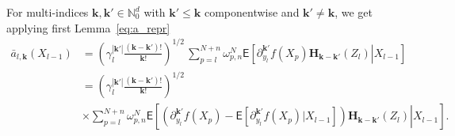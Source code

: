 \documentclass[preprint]{imsart}
\begin{document}
For multi-indices $\mathbf k,\mathbf k'\in\mathbb N_0^d$
with $\mathbf k'\le\mathbf k$ componentwise
and $\mathbf k'\ne\mathbf k$,
we get applying first Lemma~\ref{eq:a_repr}
\begin{equation*}
\begin{split}
\bar a_{l,\mathbf{k}}(X_{l-1})
&=\left(\gamma_{l}^{|\mathbf{k}'|}\frac{(\mathbf{k}-\mathbf{k}')!}{\mathbf{k}!}\right)^{1/2}
\,\sum_{p=l}^{N+n}\omega_{p,n}^N
\mathsf E\left[\left.
\partial_{y_l}^{\mathbf{k}'}f(X_p)\mathbf{H}_{\mathbf{k}-\mathbf{k}'}(Z_l)\right|X_{l-1}\right]\\
&=\left(\gamma_{l}^{|\mathbf{k}'|}\frac{(\mathbf{k}-\mathbf{k}')!}{\mathbf{k}!}\right)^{1/2}
\\
&\times \sum_{p=l}^{N+n}\omega_{p,n}^N
\mathsf E\left[\left.
\left(
\partial_{y_l}^{\mathbf{k}'}f(X_p)-\mathsf E\left[\partial_{y_l}^{\mathbf{k}'}f(X_p)|X_{l-1}\right]
\right)
\mathbf{H}_{\mathbf{k}-\mathbf{k}'}(Z_l)\right|X_{l-1}\right].
\end{split}
\end{equation*}
\end{document}
